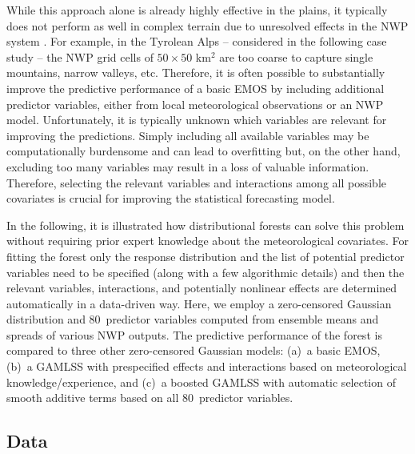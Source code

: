 \documentclass[aoas, preprint]{imsart}
\numberwithin{equation}{subsection}
\begin{document}
While this approach alone is already highly effective in the plains,
it typically does not perform as well in complex terrain due to unresolved
effects in the NWP system \citep{Bauer+Thorpe+Brunet:2015}. 
For example, in the Tyrolean Alps -- considered
in the following case study -- the NWP grid cells of $50 \times 50$
km$^2$ are too coarse to capture single mountains, narrow valleys, etc. 
Therefore, it is often possible to substantially improve the predictive 
performance of a basic EMOS by including additional predictor variables, either 
from local meteorological observations or an NWP model. Unfortunately, it is 
typically unknown which variables are relevant for improving the predictions. 
Simply including all available variables may be computationally burdensome and
can lead to overfitting but, on the other hand, excluding too many variables
may result in a loss of valuable information. Therefore, selecting
the relevant variables and interactions among all possible covariates is 
crucial for improving the statistical forecasting model.

In the following, it is illustrated how distributional forests can
solve this problem without requiring prior expert knowledge about the 
meteorological covariates.
For fitting the forest only the response distribution and the list of potential predictor
variables need to be specified (along with a few algorithmic details) and then
the relevant variables, interactions, and potentially nonlinear effects are
determined automatically in a data-driven way. Here, we employ a zero-censored
Gaussian distribution and 80~predictor variables computed from ensemble means
and spreads of various NWP outputs. The predictive performance of the forest is
compared to three other zero-censored Gaussian models: (a)~a basic
EMOS, (b)~a GAMLSS with prespecified effects and interactions based on
meteorological knowledge/experience, and (c)~a boosted GAMLSS with automatic
selection of smooth additive terms based on all 80~predictor variables.

\subsection{Data}
\label{sec:data}
\end{document}
